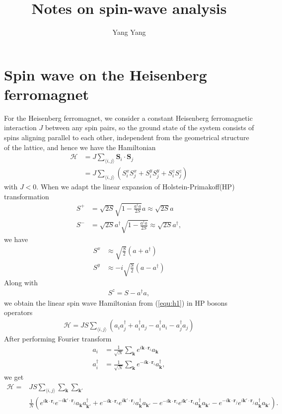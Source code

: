 \documentclass[a4paper,12pt]{article}
\title{Notes on spin-wave analysis}
\author{Yang Yang}
\begin{document}
	\maketitle
	\section{Spin wave on the Heisenberg ferromagnet}
		For the Heisenberg ferromagnet, we consider a constant Heisenberg ferromagnetic interaction $J$ between any spin pairs, so the ground state of the system consists of spins aligning parallel to each other, independent from the geometrical structure of the lattice, and hence we have the Hamiltonian
		\begin{align}
			\mathcal{H}&=J\sum_{\langle i,j \rangle}\mathbf{S}_i\cdot\mathbf{S}_j\nonumber\\
			&=J\sum_{\langle i,j \rangle}
			\label{equ:h1}\left(S_i^xS_j^x+S_i^yS_j^y+S_i^zS_j^z\right)
		\end{align}
		with $J<0$. When we adapt the linear expansion of Holstein-Primakoff(HP) transformation
		\begin{align}
			S^+&=\sqrt{2S}\sqrt{1-\frac{a^\dagger a}{2S}}a\approx\sqrt{2S}a\\
			S^-&=\sqrt{2S}a^\dagger\sqrt{1-\frac{a^\dagger a}{2S}}\approx\sqrt{2S}a^\dagger,
		\end{align}
		we have 
		\begin{align}
			S^x&\approx\sqrt{\frac{S}{2}}(a+a^\dagger)\\
			S^y&\approx-i\sqrt{\frac{S}{2}}(a-a^\dagger)
		\end{align}
		Along with
		\begin{align}
			S^z=S-a^\dagger a,
		\end{align}
		we obtain the linear spin wave Hamiltonian from (\ref{equ:h1}) in HP bosons operators
		\begin{align}
			\mathcal{H}=J S\sum_{\langle i,j \rangle}(a_ia_j^\dagger+a_i^\dagger a_j-a_i^\dagger a_i-a_j^\dagger a_j)
		\end{align}
		After performing Fourier transform
		\begin{align}
			a_i&=\frac{1}{\sqrt{N}}\sum_{\mathbf{k}}e^{i\mathbf{k}\cdot\mathbf{r}_i}a_\mathbf{k}\\
			a_i^\dagger&=\frac{1}{\sqrt{N}}\sum_{\mathbf{k}}e^{-i\mathbf{k}\cdot\mathbf{r}_i}a_\mathbf{k}^\dagger\label{equ:fourier1},
		\end{align}
		we get
		\begin{align}
			\nonumber
			\mathcal{H}=&JS\sum_{\langle i,j\rangle}\sum_{\mathbf{k}}\sum_{\mathbf{k'}}\\&\frac{1}{N}(e^{i\mathbf{k}\cdot\mathbf{r}_i}e^{-i\mathbf{k}'\cdot\mathbf{r}_j}a_\mathbf{k}a_{\mathbf{k}'}^\dagger +e^{-i\mathbf{k}\cdot\mathbf{r}_i}e^{i\mathbf{k}'\cdot\mathbf{r}_j}a_\mathbf{k}^\dagger a_{\mathbf{k}'}-e^{-i\mathbf{k}\cdot\mathbf{r}_i}e^{i\mathbf{k}'\cdot\mathbf{r}_i}a_\mathbf{k}^\dagger a_{\mathbf{k}'}-e^{-i\mathbf{k}\cdot\mathbf{r}_j}e^{i\mathbf{k}'\cdot\mathbf{r}_j}a_\mathbf{k}^\dagger a_{\mathbf{k}'}).
			\label{equ:h3}
		\end{align}
\end{document}
